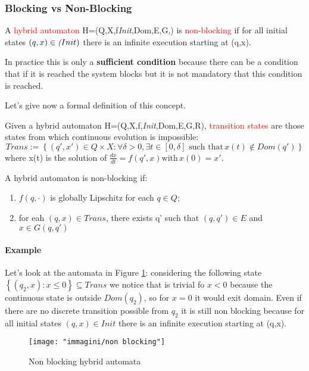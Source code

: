 \subsubsection{Blocking vs Non-Blocking}
A \textcolor{red}{hybrid automaton} H=(Q,X,f\textit{Init},Dom,E,G,) is \textcolor{red}{non-blocking} if for all initial states $(q,x) \in \emph(Init)$ there is an infinite execution starting at (q,x).
\begin{remark}
In practice this is only a \textbf{sufficient condition} because there can be a condition that if it is reached the system blocks but it is not mandatory that this condition is reached.
\end{remark}
Let's give now a formal definition of this concept.
\begin{defn}
	Given a hybrid automaton  H=(Q,X,f,\textit{Init},Dom,E,G,R), \textcolor{red}{transition states} are those states from which continuous evolution is impossible:
	\[
	Trans:=\left\{(q',x')\in Q\times X\colon \forall \delta>0,\exists t \in[0,\delta] \text{ such that} \, x(t)\notin Dom(q')\right\}
	\] where x(t) is the solution of $\frac{dx}{dt}=f(q',x) \text{with} \, x(0)=x'$.
\end{defn}
\begin{tcolorbox}
	A hybrid automaton is non-blocking if:
	\begin{enumerate}
		\item $f(q,\cdot)$ is globally Lipschitz for each $q\in Q$;
		\item for eah $(q,x)\in Trans$, there exists q' such that $(q,q')\in E$ and $x \in G(q,q')$ 
	\end{enumerate}
\end{tcolorbox}
\paragraph{Example}
Let's look at the automata in Figure \ref{fig:non-blocking}:
considering the following state$\left\{(q_2,x)\colon x\le 0\right\} \subseteq Trans$ we notice that is trivial fo $x<0$ because the continuous state is outside $Dom(q_2)$, so for $x=0$ it would exit domain. Even if  there are no discrete transition possible from $q_2$ it is still non blocking because for all initial states $(q,x)\in Init$ there is an infinite execution starting at (q,x).
\begin{figure}[h]
	\centering
	\texttt{[image: "immagini/non blocking"]}
	\caption{Non blocking hybrid automata}
	\label{fig:non-blocking}
\end{figure}
